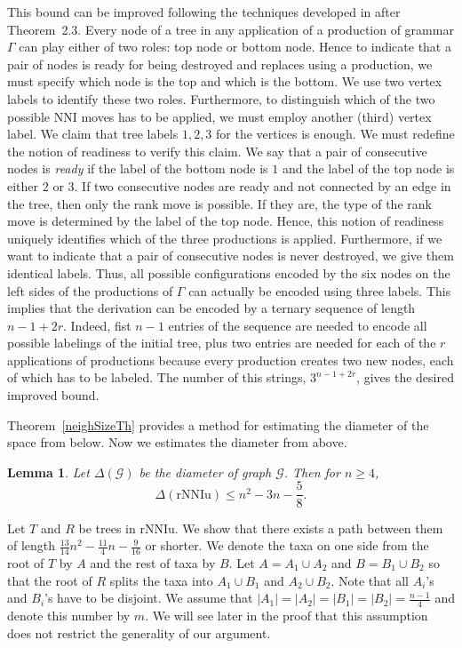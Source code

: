 \documentclass{amsart}
\newtheorem{lemma}{Lemma}
\theoremstyle{definition}
\newcommand{\nni}{\mathrm{NNI}}
\newcommand{\rnniu}{\mathrm{rNNIu}}
\newcommand{\G}{\mathcal{G}}
\begin{document}
This bound can be improved following the techniques developed in \autocite{Sleator1992-bp} after Theorem~2.3.
Every node of a tree in any application of a production of grammar $\Gamma$ can play either of two roles: top node or bottom node.
Hence to indicate that a pair of nodes is ready for being destroyed and replaces using a production, we must specify which node is the top and which is the bottom.
We use two vertex labels to identify these two roles.
Furthermore, to distinguish which of the two possible $\nni$ moves has to be applied, we must employ another (third) vertex label.
We claim that tree labels $1,2,3$ for the vertices is enough.
We must redefine the notion of readiness to verify this claim.
We say that a pair of consecutive nodes is {\em ready} if the label of the bottom node is $1$ and the label of the top node is either $2$ or $3$.
If two consecutive nodes are ready and not connected by an edge in the tree, then only the rank move is possible.
If they are, the type of the rank move is determined by the label of the top node.
Hence, this notion of readiness uniquely identifies which of the three productions is applied.
Furthermore, if we want to indicate that a pair of consecutive nodes is never destroyed, we give them identical labels.
Thus, all possible configurations encoded by the six nodes on the left sides of the productions of $\Gamma$ can actually be encoded using three labels.
This implies that the derivation can be encoded by a ternary sequence of length $n-1+2r$.
Indeed, fist $n-1$ entries of the sequence are needed to encode all possible labelings of the initial tree, plus two entries are needed for each of the $r$ applications of productions because every production creates two new nodes, each of which has to be labeled.
The number of this strings, $3^{n-1+2r}$, gives the desired improved bound.
\endproof

Theorem~\ref{neighSizeTh} provides a method for estimating the diameter of the space from below.
Now we estimates the diameter from above.

\begin{lemma}\label{diameterUpperBound}
Let $\Delta(\G)$ be the diameter of graph $\G$.
Then for $n \ge 4$,
\[
\Delta(\rnniu) \le n^2 - 3n - \frac 58.
\]
\end{lemma}

\proof
Let $T$ and $R$ be trees in $\rnniu$.
We show that there exists a path between them of length $\frac{13}{14}n^2 - \frac{11}{4}n - \frac{9}{16}$ or shorter.
We denote the taxa on one side from the root of $T$ by $A$ and the rest of taxa by $B$.
Let $A = A_1 \cup A_2$ and $B = B_1 \cup B_2$ so that the root of $R$ splits the taxa into $A_1 \cup B_1$ and $A_2 \cup B_2$.
Note that all $A_i$'s and $B_i$'s have to be disjoint.
We assume that $|A_1| = |A_2| = |B_1| = |B_2| = \frac{n-1}{4}$ and denote this number by $m$.
We will see later in the proof that this assumption does not restrict the generality of our argument.
\end{document}
